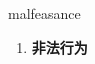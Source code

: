 
\begin{frame}
{\huge malfeasance}
\begin{center}
\begin{enumerate}\Large
  \item \textbf{非法行为}
\end{enumerate}
\end{center}
\end{frame}
